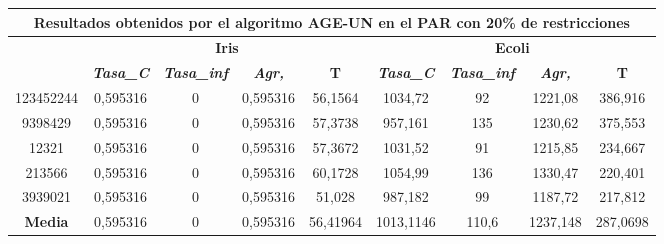 \documentclass[12pt, spanish]{article}
\begin{document}
\begin{table}[H]
\footnotesize
\begin{tabular}{|c|c|c|c|c|c|c|c|c|}
\hline
\multicolumn{9}{|c|}{\textbf{Resultados obtenidos por el algoritmo AGE-UN en el PAR con 20\% de restricciones}}                                                                                                   \\ \hline
\multirow{2}{*}{} & \multicolumn{4}{c|}{\textbf{Iris}}                                                            & \multicolumn{4}{c|}{\textbf{Ecoli}}                                                           \\ \cline{2-9} 
                  & \textit{\textbf{Tasa\_C}} & \textit{\textbf{Tasa\_inf}} & \textit{\textbf{Agr,}} & \textbf{T} & \textit{\textbf{Tasa\_C}} & \textit{\textbf{Tasa\_inf}} & \textit{\textbf{Agr,}} & \textbf{T} \\ \hline
123452244         & 0,595316                  & 0                           & 0,595316               & 56,1564    & 1034,72                   & 92                          & 1221,08                & 386,916    \\ \hline
9398429           & 0,595316                  & 0                           & 0,595316               & 57,3738    & 957,161                   & 135                         & 1230,62                & 375,553    \\ \hline
12321             & 0,595316                  & 0                           & 0,595316               & 57,3672    & 1031,52                   & 91                          & 1215,85                & 234,667    \\ \hline
213566            & 0,595316                  & 0                           & 0,595316               & 60,1728    & 1054,99                   & 136                         & 1330,47                & 220,401    \\ \hline
3939021           & 0,595316                  & 0                           & 0,595316               & 51,028     & 987,182                   & 99                          & 1187,72                & 217,812    \\ \hline
\textbf{Media}    & 0,595316                  & 0                           & 0,595316               & 56,41964   & 1013,1146                 & 110,6                       & 1237,148               & 287,0698   \\ \hline
\end{tabular}
\end{table}
\end{document}
